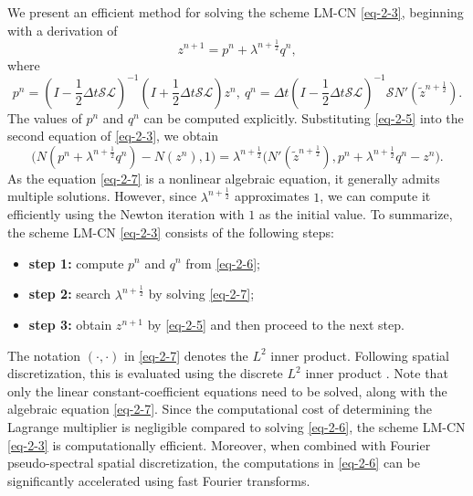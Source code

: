 \documentclass[onefignum,onetabnum]{siamart}
\begin{document}
We present an efficient method for solving the scheme LM-CN \eqref{eq-2-3}, beginning with a derivation of
\begin{equation}\label{eq-2-5}
	z^{n+1}=p^{n}+\lambda^{n+\frac{1}{2}}q^n,
\end{equation} 
where
\begin{equation}\label{eq-2-6}
	p^n=(I-\frac{1}{2}\Delta t\mathcal{S}\mathcal{L})^{-1}(I+\frac{1}{2}\Delta t\mathcal{S}\mathcal{L})z^n,\ q^n=\Delta t(I-\frac{1}{2}\Delta t\mathcal{S}\mathcal{L})^{-1}\mathcal{S}N'(\tilde{z}^{n+\frac{1}{2}}).
\end{equation}
The values of $p^n$ and $q^n$ can be computed explicitly. Substituting \eqref{eq-2-5} into the second equation of \eqref{eq-2-3}, we obtain
\begin{equation}\label{eq-2-7}
	\big(N(p^{n}+\lambda^{n+\frac{1}{2}}q^n)-N(z^n),1\big)=\lambda^{n+\frac{1}{2}}\big(N'(\tilde{z}^{n+\frac{1}{2}}),p^{n}+\lambda^{n+\frac{1}{2}}q^n-z^n\big).
\end{equation}  
As the equation \eqref{eq-2-7} is a nonlinear algebraic equation, it generally admits multiple solutions. However, since $\lambda^{n+\frac{1}{2}}$ approximates $1$, we can compute it efficiently using the Newton iteration with $1$ as the initial value. To summarize, the scheme LM-CN \eqref{eq-2-3} consists of the following steps:
\begin{algorithm}[H]
\begin{itemize}
	\item[{\textbf{$\star$}}]\textbf{step 1:} compute $p^n$ and $q^n$ from \eqref{eq-2-6};
	\item[{\textbf{$\star$}}]\textbf{step 2:} search $\lambda^{n+\frac{1}{2}}$ by solving \eqref{eq-2-7};
	\item[{\textbf{$\star$}}]\textbf{step 3:} obtain $z^{n+1}$ by \eqref{eq-2-5} and then proceed to the next step.
\end{itemize}
\end{algorithm}

The notation $(\cdot,\cdot)$ in \eqref{eq-2-7} denotes the $L^2$ inner product. Following spatial discretization, this is evaluated using the discrete $L^2$ inner product \cite{shen-11-spectral}. Note that only the linear constant-coefficient equations need to be solved, along with the algebraic equation \eqref{eq-2-7}. Since the computational cost of determining the Lagrange multiplier is negligible compared to solving \eqref{eq-2-6}, the scheme LM-CN \eqref{eq-2-3} is computationally efficient. Moreover, when combined with Fourier pseudo-spectral spatial discretization, the computations in \eqref{eq-2-6} can be significantly accelerated using fast Fourier transforms.
\end{document}
